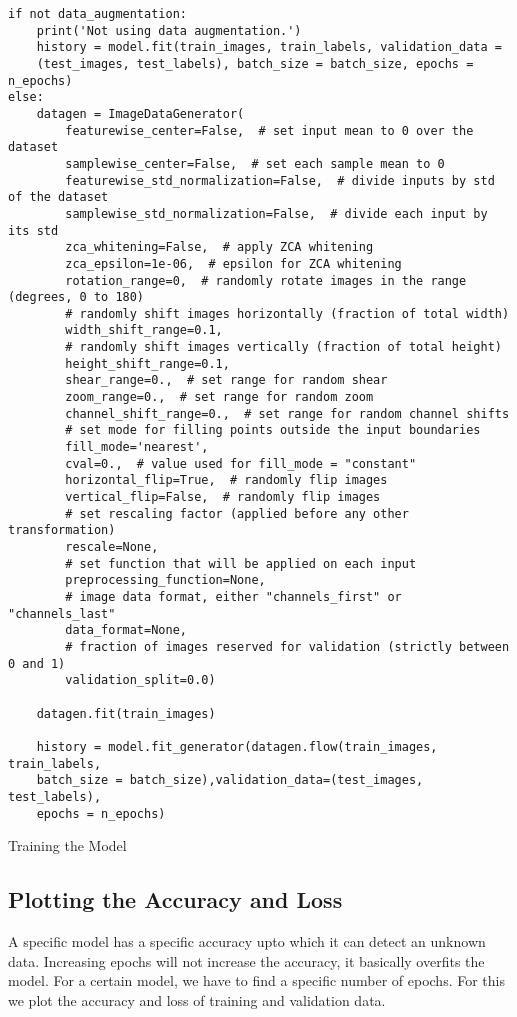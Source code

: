 \begin{longlisting}
    \begin{verbatim}
if not data_augmentation:
    print('Not using data augmentation.')
    history = model.fit(train_images, train_labels, validation_data =
    (test_images, test_labels), batch_size = batch_size, epochs = n_epochs)
else:
    datagen = ImageDataGenerator(
        featurewise_center=False,  # set input mean to 0 over the dataset
        samplewise_center=False,  # set each sample mean to 0
        featurewise_std_normalization=False,  # divide inputs by std of the dataset
        samplewise_std_normalization=False,  # divide each input by its std
        zca_whitening=False,  # apply ZCA whitening
        zca_epsilon=1e-06,  # epsilon for ZCA whitening
        rotation_range=0,  # randomly rotate images in the range (degrees, 0 to 180)
        # randomly shift images horizontally (fraction of total width)
        width_shift_range=0.1,
        # randomly shift images vertically (fraction of total height)
        height_shift_range=0.1,
        shear_range=0.,  # set range for random shear
        zoom_range=0.,  # set range for random zoom
        channel_shift_range=0.,  # set range for random channel shifts
        # set mode for filling points outside the input boundaries
        fill_mode='nearest',
        cval=0.,  # value used for fill_mode = "constant"
        horizontal_flip=True,  # randomly flip images
        vertical_flip=False,  # randomly flip images
        # set rescaling factor (applied before any other transformation)
        rescale=None,
        # set function that will be applied on each input
        preprocessing_function=None,
        # image data format, either "channels_first" or "channels_last"
        data_format=None,
        # fraction of images reserved for validation (strictly between 0 and 1)
        validation_split=0.0)
    
    datagen.fit(train_images)
    
    history = model.fit_generator(datagen.flow(train_images, train_labels,
    batch_size = batch_size),validation_data=(test_images, test_labels),
    epochs = n_epochs)    
    \end{verbatim}
    \caption{Training the Model}
\label{listing:4.6}
\end{longlisting}
\subsection{Plotting the Accuracy and Loss}
A specific model has a specific accuracy upto which it can detect an unknown data.
Increasing epochs will not increase the accuracy, it basically overfits
the model. For a certain model, we have to find a specific number
of epochs. For this we plot the accuracy and loss of training and
validation data.

